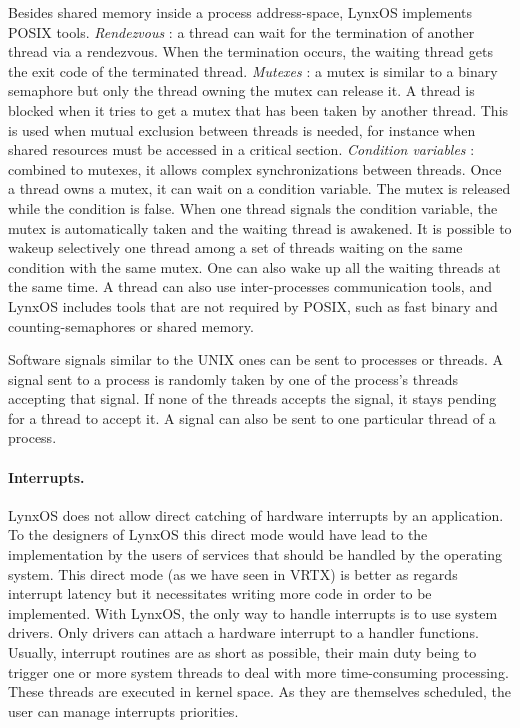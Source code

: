 \documentclass[10pt]{report}
\begin{document}
Besides shared memory inside a process address-space, LynxOS implements POSIX tools. {\em Rendezvous} : a thread can wait
for the termination of another thread via a rendezvous. When the termination occurs, the waiting thread gets the exit code of the
terminated thread. {\em Mutexes} : a mutex is similar to a binary semaphore but only the thread owning the mutex can release it.
A thread is blocked when it tries to get a mutex that has been taken by another thread. This is used when mutual exclusion between threads
is needed, for instance when shared resources must be accessed in a critical section. {\em Condition variables} : combined to mutexes,
it allows complex synchronizations between threads. Once a thread owns a mutex, it can wait on a condition variable. The mutex is released
while the condition is false. When one thread signals the condition variable, the mutex is automatically taken and the waiting thread is
awakened. It is possible to wakeup selectively one thread among a set of threads waiting on the same condition with the same mutex. One can also
wake up all the waiting threads at the same time. A thread can also use inter-processes communication tools, and LynxOS includes tools that
are not required by POSIX, such as fast binary and counting-semaphores or shared memory.

Software signals similar to the UNIX ones can be sent to processes or threads. A signal sent to a process is randomly taken by one of the
process's threads accepting that signal. If none of the threads accepts the signal, it stays pending for a thread to accept it. A signal can also
be sent to one particular thread of a process.

\paragraph{Interrupts.} LynxOS does not allow direct catching of hardware interrupts by an application. To the designers of LynxOS 
this direct mode would have lead to the implementation by the users of services that should be handled by the operating system. 
This direct mode (as we have seen in VRTX) is better as regards interrupt latency but it necessitates writing more code in order to be implemented. 
With LynxOS, the only way to handle interrupts is to use system drivers. Only drivers can attach a hardware interrupt to a handler functions. 
Usually, interrupt routines are as short as possible, their main duty being to trigger one or more system threads to deal with more 
time-consuming processing. These threads are executed in kernel space. As they are themselves scheduled, the user can manage interrupts 
priorities.
\end{document}
